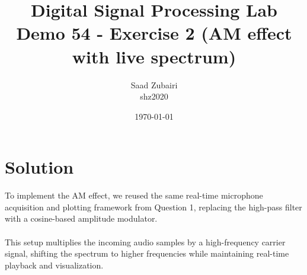 \documentclass[11pt]{article}
\title{
    \vspace{3em}
    \textbf{Digital Signal Processing Lab}\\
    Demo 54 - Exercise 2 (AM effect with live spectrum)
    \vspace{1em}
}
\author{
    Saad Zubairi \\ 
    shz2020 \\
    \vspace{1em}
}
\date{\today}
\begin{document}
\maketitle	

\pagebreak



\section*{Solution}

To implement the AM effect, we reused the same real-time microphone acquisition and plotting framework from Question 1, replacing the high-pass filter with a cosine-based amplitude modulator.\\
\\
This setup multiplies the incoming audio samples by a high-frequency carrier signal, shifting the spectrum to higher frequencies while maintaining real-time playback and visualization.
\end{document}
